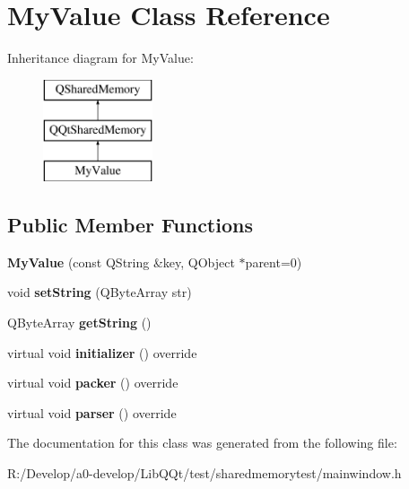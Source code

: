 \hypertarget{class_my_value}{}\section{My\+Value Class Reference}
\label{class_my_value}
Inheritance diagram for My\+Value\+:\begin{figure}[H]
\begin{center}
\leavevmode
\includegraphics[height=3.000000cm]{class_my_value}
\end{center}
\end{figure}
\subsection*{Public Member Functions}
\begin{DoxyCompactItemize}
\item 
\mbox{\label{class_my_value_a2409bc4087d124bb42716810fb857047}} 
{\bfseries My\+Value} (const Q\+String \&key, Q\+Object $\ast$parent=0)
\item 
\mbox{\label{class_my_value_a646369013739c15593eb16944736f383}} 
void {\bfseries set\+String} (Q\+Byte\+Array str)
\item 
\mbox{\label{class_my_value_a3b27868267bdf8530e2693efeb2e688a}} 
Q\+Byte\+Array {\bfseries get\+String} ()
\item 
\mbox{\label{class_my_value_a01c14bd9323b139922a5af2de8ae222f}} 
virtual void {\bfseries initializer} () override
\item 
\mbox{\label{class_my_value_a93bd35b1a612fc88cb93404a24ed4753}} 
virtual void {\bfseries packer} () override
\item 
\mbox{\label{class_my_value_ab9f4dfcb8b58646c0c9e6784b93b791c}} 
virtual void {\bfseries parser} () override
\end{DoxyCompactItemize}


The documentation for this class was generated from the following file\+:\begin{DoxyCompactItemize}
\item 
R\+:/\+Develop/a0-\/develop/\+Lib\+Q\+Qt/test/sharedmemorytest/mainwindow.\+h\end{DoxyCompactItemize}
